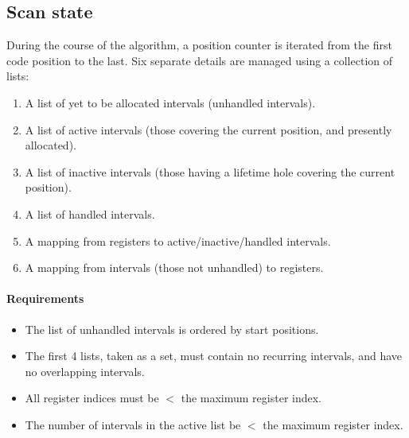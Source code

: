 \documentclass{llncs}
\begin{document}
\subsection{Scan state}
\label{sec:scanstate}

During the course of the algorithm, a position counter is iterated from the
first code position to the last.  Six separate details are managed using a
collection of lists:

\begin{enumerate}
\item A list of yet to be allocated intervals (unhandled intervals).
\item A list of active intervals (those covering the current position, and
  presently allocated).
\item A list of inactive intervals (those having a lifetime hole covering the
  current position).
\item A list of handled intervals.
\item A mapping from registers to active/inactive/handled intervals.
\item A mapping from intervals (those not unhandled) to registers.
\end{enumerate}

\paragraph{Requirements}

\begin{itemize}
\item The list of unhandled intervals is ordered by start positions.
\item The first 4 lists, taken as a set, must contain no recurring
  intervals, and have no overlapping intervals.
\item All register indices must be $<$ the maximum register index.
\item The number of intervals in the active list be $<$ the maximum register
  index.
\end{itemize}
\end{document}
